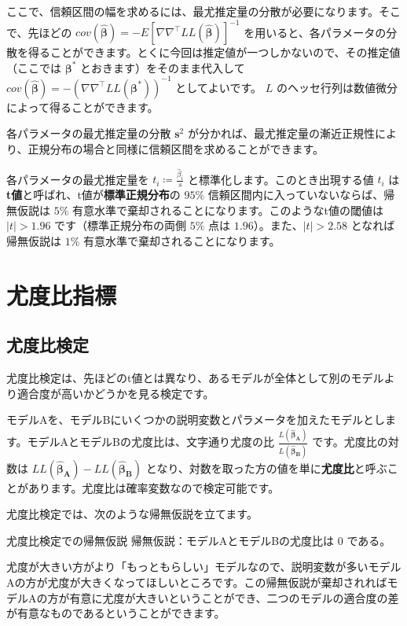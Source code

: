 ここで、信頼区間の幅を求めるには、最尤推定量の分散が必要になります。そこで、先ほどの $cov(\bm{\hat\beta}) = -E\left[\nabla\nabla^\top LL(\bm{\hat\beta})\right]^{-1}$ を用いると、各パラメータの分散を得ることができます。とくに今回は推定値が一つしかないので、その推定値（ここでは $\bm\beta^*$ とおきます）をそのまま代入して $cov(\bm{\hat\beta}) = -\left(\nabla\nabla^\top LL(\bm\beta^*)\right)^{-1}$ としてよいです。 $L$ のヘッセ行列は数値微分によって得ることができます。

各パラメータの最尤推定量の分散 $\bm s^2$ が分かれば、最尤推定量の漸近正規性により、正規分布の場合と同様に信頼区間を求めることができます。

各パラメータの最尤推定量を $t_i\coloneq\frac{\hat\beta_i}{s}$ と標準化します。このとき出現する値 $t_i$ は\textbf{t値}と呼ばれ、t値が\textbf{標準正規分布}の $95\%$ 信頼区間内に入っていないならば、帰無仮説は $5\%$ 有意水準で棄却されることになります。このようなt値の閾値は $|t|>1.96$ です（標準正規分布の両側 $5\%$ 点は $1.96$）。また、$|t|>2.58$ となれば帰無仮説は $1\%$ 有意水準で棄却されることになります。

\section{尤度比指標}\label{sec:likelihood_ratio}

\subsection{尤度比検定}

尤度比検定は、先ほどのt値とは異なり、あるモデルが全体として別のモデルより適合度が高いかどうかを見る検定です。

モデルAを、モデルBにいくつかの説明変数とパラメータを加えたモデルとします。モデルAとモデルBの尤度比は、文字通り尤度の比 $\frac{L(\bm{\hat\beta_A})}{L(\bm{\hat\beta_B})}$ です。尤度比の対数は $LL(\bm{\hat\beta_A})-LL(\bm{\hat\beta_B})$ となり、対数を取った方の値を単に\textbf{尤度比}と呼ぶことがあります。尤度比は確率変数なので検定可能です。

尤度比検定では、次のような帰無仮説を立てます。

\begin{itembox}[l]{尤度比検定での帰無仮説}
    帰無仮説：モデルAとモデルBの尤度比は $0$ である。
\end{itembox}

尤度が大きい方がより「もっともらしい」モデルなので、説明変数が多いモデルAの方が尤度が大きくなってほしいところです。この帰無仮説が棄却されればモデルAの方が有意に尤度が大きいということができ、二つのモデルの適合度の差が有意なものであるということができます。

